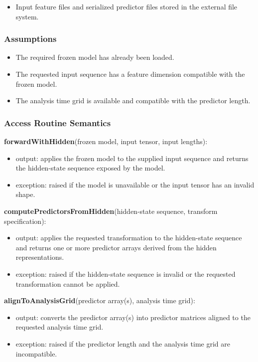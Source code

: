 \documentclass[12pt, titlepage]{article}
\begin{document}
\begin{itemize}
    \item Input feature files and serialized predictor files stored in the external file system.
\end{itemize}

\subsubsection{Assumptions}

\begin{itemize}
    \item The required frozen model has already been loaded.
    \item The requested input sequence has a feature dimension compatible with the frozen model.
    \item The analysis time grid is available and compatible with the predictor length.
\end{itemize}

\subsubsection{Access Routine Semantics}

\noindent \textbf{forwardWithHidden}(frozen model, input tensor, input lengths):
\begin{itemize}
    \item output: applies the frozen model to the supplied input sequence and returns the hidden-state sequence exposed by the model.
    \item exception: raised if the model is unavailable or the input tensor has an invalid shape.
\end{itemize}

\noindent \textbf{computePredictorsFromHidden}(hidden-state sequence, transform specification):
\begin{itemize}
    \item output: applies the requested transformation to the hidden-state sequence and returns one or more predictor arrays derived from the hidden representations.
    \item exception: raised if the hidden-state sequence is invalid or the requested transformation cannot be applied.
\end{itemize}

\noindent \textbf{alignToAnalysisGrid}(predictor array(s), analysis time grid):
\begin{itemize}
    \item output: converts the predictor array(s) into predictor matrices aligned to the requested analysis time grid.
    \item exception: raised if the predictor length and the analysis time grid are incompatible.
\end{itemize}
\end{document}
